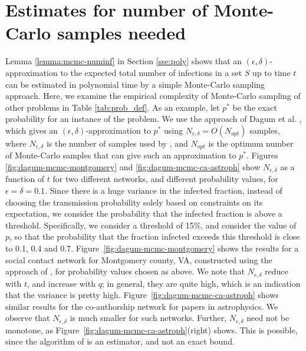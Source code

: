 
\section{Estimates for number of Monte-Carlo samples needed}
\label{sec:experiments}

Lemma \ref{lemma:mcmc-numinf} in Section \ref{sse:poly} shows that an 
$(\epsilon, \delta)$-approximation to the expected total number of infections 
in a set $S$ up to time $t$ can be estimated in polynomial time by a simple
Monte-Carlo sampling approach. Here, we examine the empirical complexity
of Monte-Carlo sampling of other problems in Table \ref{tab:prob_def}.
As an example, let $p^*$ be the exact probability for an instance of the \tTotInfs{} problem.
We use the approach of Dagum et al. \cite{dagum:focs95}, which gives an
$(\epsilon, \delta)$-approximation to $p^*$ using 
$N_{\epsilon, \delta} = O(N_{opt})$ samples, where
$N_{\epsilon, \delta}$ is the number of samples used by \cite{dagum:focs95}, and
$N_{opt}$ is the optimum number of Monte-Carlo samples that can give such an approximation
to $p^*$.  Figures \ref{fig:dagum-mcmc-montgomery} and \ref{fig:dagum-mcmc-ca-astroph}
show $N_{\epsilon, \delta}$ as a function
of $t$ for two different networks, and different probability values, for 
$\epsilon = \delta=0.1$.
Since there is a huge variance in the infected fraction, instead of
choosing the transmission probability solely based on constraints on its expectation,
we consider the probability that the infected fraction is above a threshold.
Specifically, we consider a threshold of 15\%, and consider the value of $p$, so that
the probability that the fraction infected exceeds this threshold is close to 0.1,
0.4 and 0.7.
Figure~\ref{fig:dagum-mcmc-montgomery} shows the results for
a social contact network for Montgomery county, VA, 
constructed using the approach of \cite{eubank:nature04, barrett:wsc09},
for probability values chosen as above.
We note that $N_{\epsilon, \delta}$ reduce with $t$, and increase with $q$;
in general, they are quite high, which is an indication that the variance is pretty high.
Figure~\ref{fig:dagum-mcmc-ca-astroph} shows similar results for the co-authorship
network for papers in astrophysics. We observe that $N_{\epsilon, \delta}$ is
much smaller for such networks. Further, $N_{\epsilon, \delta}$ need not be monotone,
as Figure~\ref{fig:dagum-mcmc-ca-astroph}(right) shows. This is possible, since the
algorithm of \cite{dagum:focs95} is an estimator, and not an exact bound.

